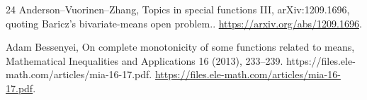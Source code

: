 \documentclass[11pt]{article}
\numberwithin{equation}{section}
\theoremstyle{definition}
\theoremstyle{remark}
\newcommand{\1}{\mathbf 1}
\begin{document}
\begin{thebibliography}{24}
Anderson--Vuorinen--Zhang, Topics in special functions III, arXiv:1209.1696, quoting Baricz's bivariate-means open problem..
\url{https://arxiv.org/abs/1209.1696}.

Adam Bessenyei, On complete monotonicity of some functions related to means, Mathematical Inequalities and Applications 16 (2013), 233--239. https://files.ele-math.com/articles/mia-16-17.pdf.
\url{https://files.ele-math.com/articles/mia-16-17.pdf}.

\end{thebibliography}
\end{document}
